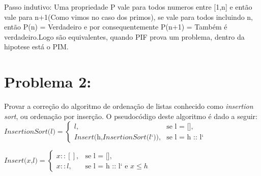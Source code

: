 \documentclass[a4paper, 10pt]{article}
\begin{document}
Passo indutivo: Uma propriedade P vale para todos numeros entre [1,n] e então vale para n+1(Como vimos no caso dos primos), se vale para todos incluindo n, então P(n) = Verdadeiro e por consequentemente P(n+1) = Também é verdadeiro.Logo são equivalentes, quando PIF prova um problema, dentro da hipotese está o PIM.\checkmark




\section{Problema 2:}

Provar a correção do algoritmo de ordenação de listas conhecido como \textit {insertion sort}, ou ordenação por inserção.
O pseudocódigo deste algoritmo é dado a seguir:\\

$\textit{InsertionSort(l)}=\begin{cases}
l,& \text{se l = []},\\
\textit{Insert(h,InsertionSort(l`))},& \text{se l = h :: l`}
\end{cases}$

$\textit{Insert(x,l)}=\begin{cases}
x :: [],& \text{se l = []},\\
x ::l,& \text{se l = h :: l` e $x \leq h$}
\end{cases}$
\end{document}
